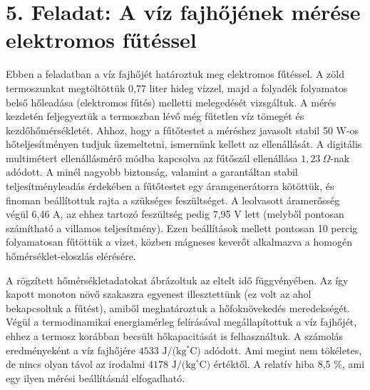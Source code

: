 \documentclass{article}
\begin{document}
\section*{5. Feladat: A víz fajhőjének mérése elektromos fűtéssel}

Ebben a feladatban a víz fajhőjét határoztuk meg elektromos fűtéssel. A zöld termoszunkat megtöltöttük 0,77 liter hideg vízzel, majd a folyadék folyamatos belső hőleadása (elektromos fűtés) melletti melegedését vizsgáltuk. A mérés kezdetén feljegyeztük a termoszban lévő még fűtetlen víz tömegét és kezdőhőmérsékletét. Ahhoz, hogy a fűtőtestet a méréshez javasolt stabil 50 W-os hőteljesítményen tudjuk üzemeltetni, ismernünk kellett az ellenállását. A digitális multimétert ellenállásmérő módba kapcsolva az fűtőszál ellenállása $1,23\ \Omega$-nak adódott. A minél nagyobb biztonság, valamint a garantáltan stabil teljesítményleadás érdekében a fűtőtestet egy áramgenerátorra kötöttük, és finoman beállítottuk rajta a szükséges feszültséget. A leolvasott áramerősség végül 6,46 A, az ehhez tartozó feszültség pedig 7,95 V lett (melyből pontosan számítható a villamos teljesítmény). Ezen beállítások mellett pontosan 10 percig folyamatosan fűtöttük a vizet, közben mágneses keverőt alkalmazva a homogén hőmérséklet-eloszlás elérésére.

A rögzített hőmérsékletadatokat ábrázoltuk az eltelt idő függvényében. Az így kapott monoton növő szakaszra egyenest illesztettünk (ez volt az ahol bekapcsoltuk a fűtést), amiből meghatároztuk a hőfoknövekedés meredekségét. Végül a termodinamikai energiamérleg felírásával megállapítottuk a víz fajhőjét, ehhez a termosz korábban becsült hőkapacitását is felhasználtuk. A számolás eredményeként a víz fajhőjére $4533 \text{ J/(kg}^{\circ}\text{C)}$ adódott. Ami megint nem tökéletes, de nincs olyan távol az irodalmi $4178 \text{ J/(kg}^{\circ}\text{C)}$ értéktől. A relatív hiba 8,5 $\%$, ami egy ilyen mérési beállításnál elfogadható. 

\end{document}
